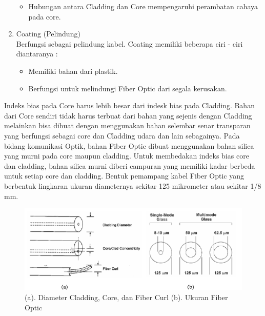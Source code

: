 \begin{flushleft}
\begin{enumerate}
\begin{itemize}
	\item Hubungan antara Cladding dan Core mempengaruhi perambatan cahaya pada core.
	\end{itemize}
\item Coating (Pelindung) \\ Berfungsi sebagai pelindung kabel. Coating memiliki beberapa ciri - ciri diantaranya : \\
	\begin{itemize}
	\item Memiliki bahan dari plastik.
	\item Berfungsi untuk melindungi Fiber Optic dari segala kerusakan.
	\end{itemize}
\end{enumerate}
\end{flushleft}
\begin{flushleft}
Indeks bias pada Core harus lebih besar dari indesk bias pada Cladding. Bahan dari Core sendiri tidak harus terbuat dari bahan yang sejenis dengan Cladding melainkan bisa dibuat dengan menggunakan bahan selembar senar transparan yang berfungsi sebagai core dan Cladding udara dan lain sebagainya. Pada bidang komunikasi Optik, bahan Fiber Optic dibuat menggunakan bahan silica yang murni pada core maupun cladding. Untuk membedakan indeks bias core dan cladding, bahan silica murni diberi campuran yang memiliki kadar berbeda untuk setiap core dan cladding. Bentuk pemampang kabel Fiber Optic yang berbentuk lingkaran ukuran diameternya sekitar 125 mikrometer atau sekitar 1/8 mm.
\begin{figure}[ht]
\centerline{\includegraphics[width=1\textwidth]{figures/sizeanddiameter.png}}
\caption{(a). Diameter Cladding, Core, dan Fiber Curl  (b). Ukuran Fiber Optic}
\label{Skema Fiber Optic_01}
\end{figure}
\end{flushleft}
